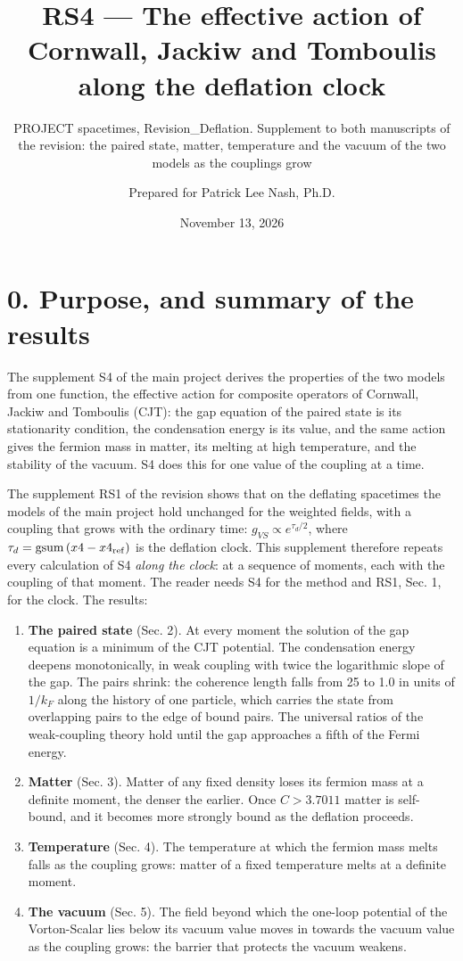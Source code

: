 \documentclass[
  10pt,
]{article}
\title{RS4 --- The effective action of Cornwall, Jackiw and Tomboulis
along the deflation clock}
\subtitle{PROJECT spacetimes, Revision\_Deflation. Supplement to both
manuscripts of the revision: the paired state, matter, temperature and
the vacuum of the two models as the couplings grow}
\author{Prepared for Patrick Lee Nash, Ph.D.}
\date{November 13, 2026}
\providecommand{\tightlist}{%
  \setlength{\itemsep}{0pt}\setlength{\parskip}{0pt}}
\begin{document}
\maketitle

\hypertarget{purpose-and-summary-of-the-results}{%
\section{0. Purpose, and summary of the
results}\label{purpose-and-summary-of-the-results}}

The supplement S4 of the main project derives the properties of the two
models from one function, the effective action for composite operators
of Cornwall, Jackiw and Tomboulis (CJT): the gap equation of the paired
state is its stationarity condition, the condensation energy is its
value, and the same action gives the fermion mass in matter, its melting
at high temperature, and the stability of the vacuum. S4 does this for
one value of the coupling at a time.

The supplement RS1 of the revision shows that on the deflating
spacetimes the models of the main project hold unchanged for the
weighted fields, with a coupling that grows with the ordinary time:
\(g_{VS}\propto e^{\tau_d/2}\), where
\(\tau_d=\mathrm{gsum}\,(x4-x4_{\rm ref})\) is the deflation clock. This
supplement therefore repeats every calculation of S4 \emph{along the
clock}: at a sequence of moments, each with the coupling of that moment.
The reader needs S4 for the method and RS1, Sec. 1, for the clock. The
results:

\begin{enumerate}
\def\labelenumi{\arabic{enumi}.}
\tightlist
\item
  \textbf{The paired state} (Sec. 2). At every moment the solution of
  the gap equation is a minimum of the CJT potential. The condensation
  energy deepens monotonically, in weak coupling with twice the
  logarithmic slope of the gap. The pairs shrink: the coherence length
  falls from 25 to 1.0 in units of \(1/k_F\) along the history of one
  particle, which carries the state from overlapping pairs to the edge
  of bound pairs. The universal ratios of the weak-coupling theory hold
  until the gap approaches a fifth of the Fermi energy.
\item
  \textbf{Matter} (Sec. 3). Matter of any fixed density loses its
  fermion mass at a definite moment, the denser the earlier. Once
  \(C>3.7011\) matter is self-bound, and it becomes more strongly bound
  as the deflation proceeds.
\item
  \textbf{Temperature} (Sec. 4). The temperature at which the fermion
  mass melts falls as the coupling grows: matter of a fixed temperature
  melts at a definite moment.
\item
  \textbf{The vacuum} (Sec. 5). The field beyond which the one-loop
  potential of the Vorton-Scalar lies below its vacuum value moves in
  towards the vacuum value as the coupling grows: the barrier that
  protects the vacuum weakens.
\end{enumerate}
\end{document}

